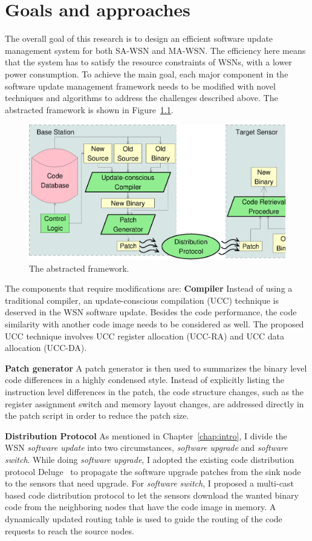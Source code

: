  \chapter{Goals and approaches}\label{chap:goals}
The overall goal of this research is to design an efficient software update management system for both SA-WSN and MA-WSN. The efficiency here means that the system has to satisfy the resource constraints of WSNs, with a lower power consumption. To achieve the main goal, each major component in the software update management framework needs to be modified with novel techniques and algorithms to address the challenges described above. The abstracted framework is shown in Figure~\ref{fig:framework}.

\begin{figure}[htbp]
	\centering
		\includegraphics[scale=0.45]{figures/framework.eps}
	\caption{The abstracted framework.}
	\label{fig:framework}
\end{figure}

The components that require modifications are:
\textbf{Compiler}
Instead of using a traditional compiler, an update-conscious compilation (UCC) technique is deserved in the WSN software update. Besides the code performance, the code similarity with another code image needs to be considered as well. 
The proposed UCC technique involves UCC register allocation (UCC-RA) and UCC data allocation (UCC-DA).

\textbf{Patch generator}
A patch generator is then used to summarizes the binary level code differences in a highly condensed style. Instead of explicitly listing the instruction level differences in the patch, the code structure changes, such as the register assignment switch and memory layout changes, are addressed directly in the patch script in order to reduce the patch size. 

\textbf{Distribution Protocol}
As mentioned in Chapter~\ref{chap:intro}, I divide the WSN {\it software update} into two circumstances, {\it software upgrade} and {\it software switch}.
While doing {\it software upgrade}, I adopted the existing code distribution protocol Deluge~\cite{deluge} to propagate the software upgrade patches from the sink node to the sensors that need upgrade. 
For \textit{software switch}, I proposed a multi-cast based code distribution protocol to let the sensors download the wanted binary code from the neighboring nodes that have the code image in memory. A dynamically updated routing table is used to guide the routing of the code requests to reach the source nodes.


